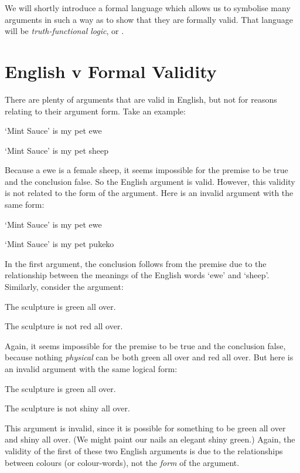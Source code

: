 \documentclass[PHIL101-Textbook.tex]{subfiles}
\begin{document}
We will shortly introduce a formal language which allows us to symbolise many arguments in such a way as to show that they are formally valid. That language will be \emph{truth-functional logic}, or \tfl.



\section{English v Formal Validity}
There are plenty of arguments that are valid in English, but not for reasons relating to their argument form. Take an example:
	\begin{earg}
		\item[] `Mint Sauce' is my pet ewe
		\item[\therefore] `Mint Sauce' is my pet sheep
	\end{earg}
Because a ewe is a female sheep, it seems impossible for the premise to be true and the conclusion false. So the English argument is valid. However, this validity is not related to the form of the argument. Here is an invalid argument with the same form:
	\begin{earg}
		\item[] `Mint Sauce' is my pet ewe
		\item[\therefore] `Mint Sauce' is my pet pukeko
	\end{earg}
In the first argument, the conclusion follows from the premise due to the relationship between the meanings of the English words `ewe' and `sheep'. Similarly, consider the argument:
	\begin{earg}
		\item[] The sculpture is green all over.
		\item[\therefore] The sculpture is not red all over. 
	\end{earg}
Again, it seems impossible for the premise to be true and the conclusion false, because nothing \emph{physical} can be both green all over and red all over. But here is an invalid argument with the same logical form:
	\begin{earg}
		\item[] The sculpture is green all over.
		\item[\therefore] The sculpture is not shiny all over.
	\end{earg}
This argument is invalid, since it is possible for something to be green all over and shiny all over. (We might paint our nails an elegant shiny green.) Again, the validity of the first of these two English arguments is due to the relationships between colours (or colour-words), not the \emph{form} of the argument.
\end{document}
